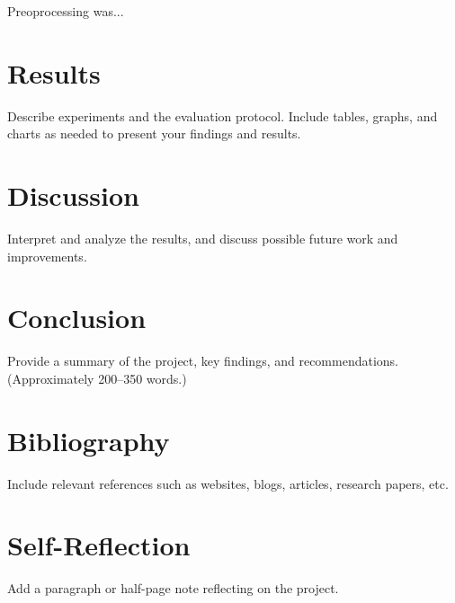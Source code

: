\documentclass[12pt]{article}
\begin{document}
Preoprocessing was...

\section{Results}
Describe experiments and the evaluation protocol. Include tables, graphs, and charts as needed to present your findings and results.

\section{Discussion}
Interpret and analyze the results, and discuss possible future work and improvements.

\section{Conclusion}
Provide a summary of the project, key findings, and recommendations. (Approximately 200--350 words.)

\section{Bibliography}
Include relevant references such as websites, blogs, articles, research papers, etc.

\section{Self-Reflection}
Add a paragraph or half-page note reflecting on the project.
\end{document}

